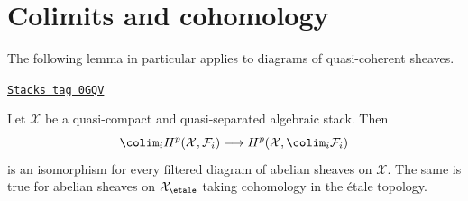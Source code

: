 \section{Colimits and cohomology}
\label{stacks-cohomology-section-colimits}
The following lemma in particular applies to diagrams of quasi-coherent
sheaves.

\begin{lemma}[Colimits]
\label{stacks-cohomology-lemma-colimits}
\href{https://stacks.math.columbia.edu/tag/0GQV}{\texttt{Stacks tag 0GQV}}

Let $\mathcal{X}$ be a quasi-compact and quasi-separated algebraic stack.
Then
$$
\colim_i H^p(\mathcal{X}, \mathcal{F}_i)
\longrightarrow
H^p(\mathcal{X}, \colim_i \mathcal{F}_i)
$$
is an isomorphism for every filtered diagram of abelian sheaves on
$\mathcal{X}$. The same is true for abelian sheaves on $\mathcal{X}_\etale$
taking cohomology in the \'etale topology.
\end{lemma}


